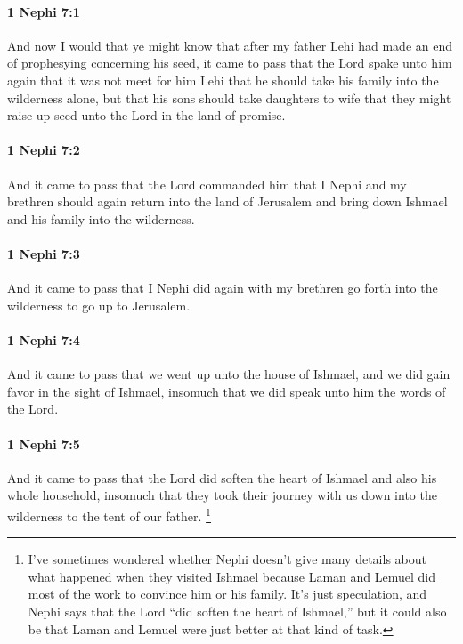 		\paragraph{1 Nephi 7:1} %
			\label{1NEPHI-7-1}

			And now I would that ye might know that
			after my father Lehi had made an end of prophesying concerning his seed,
			it came to pass that the Lord spake unto him again
			that it was not meet for him Lehi
			that he should take his family into the wilderness alone,
			but that his sons should take daughters to wife
			that they might raise up seed unto the Lord in the land of promise.

		\paragraph{1 Nephi 7:2} %
			\label{1NEPHI-7-2}

			And it came to pass that the Lord commanded him
			that I Nephi and my brethren should again return into the land of Jerusalem
			and bring down Ishmael and his family into the wilderness.

		\paragraph{1 Nephi 7:3} %
			\label{1NEPHI-7-3}

			And it came to pass that I Nephi did again with my brethren
			go forth into the wilderness to go up to Jerusalem.

		\paragraph{1 Nephi 7:4} %
			\label{1NEPHI-7-4}

			And it came to pass that we went up unto the house of Ishmael,
			and we did gain favor in the sight of Ishmael,
			insomuch that we did speak unto him the words of the Lord.

		\paragraph{1 Nephi 7:5} %
			\label{1NEPHI-7-5}

			And it came to pass that the Lord did soften the heart of Ishmael
			and also his whole household,
			insomuch that they took their journey with us
			down into the wilderness to the tent of our father.%
				\footnote{%
					\label{1-NEPHI-7-5-NOTE-ishmael}%
					I've sometimes wondered whether Nephi doesn't give many details about what happened when they visited Ishmael because Laman and Lemuel did most of the work to convince him or his family. It's just speculation, and Nephi says that the Lord ``did soften the heart of Ishmael,'' but it could also be that Laman and Lemuel were just better at that kind of task.
					}


